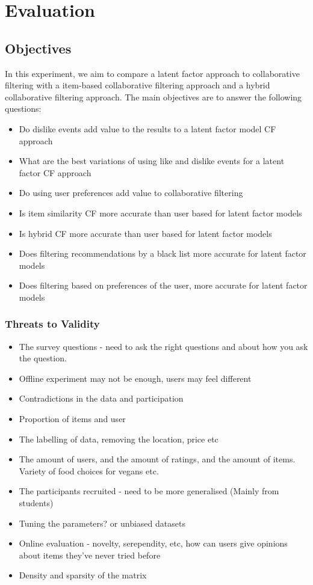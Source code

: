 \chapter{Evaluation}\label{C:evaluation}

\section{Objectives}

In this experiment, we aim to compare a latent factor approach to collaborative filtering with a item-based collaborative filtering approach and a hybrid collaborative filtering approach. The main objectives are to answer the following questions:
\begin{itemize}
	\item{Do dislike events add value to the results to a latent factor model CF approach}
	\item{What are the best variations of using like and dislike events for a latent factor CF approach}
	\item{Do using user preferences add value to collaborative filtering}
	\item{Is item similarity CF more accurate than user based for latent factor models}
	\item{Is hybrid CF more accurate than user based for latent factor models}
	\item{Does filtering recommendations by a black list more accurate for latent factor models}
	\item{Does filtering based on preferences of the user, more accurate for latent factor models}
\end{itemize}

\subsection{Threats to Validity}
\begin{itemize}
	\item{The survey questions - need to ask the right questions and about how you ask the question.}
	\item{Offline experiment may not be enough, users may feel different}
	\item{Contradictions in the data and participation}
	\item{Proportion of items and user}
	\item{The labelling of data, removing the location, price etc}
	\item{The amount of users, and the amount of ratings, and the amount of items. Variety of food choices for vegans etc. }
	\item{The participants recruited - need to be more generalised (Mainly from students)}
	\item{Tuning the parameters? or unbiased datasets}
	\item{Online evaluation - novelty, serependity, etc, how can users give opinions about items they've never tried before}
	\item{Density and sparsity of the matrix}
\end{itemize}

